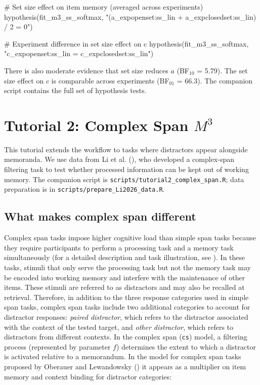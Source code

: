 \documentclass[
  man,
  floatsintext,
  longtable,
  nolmodern,
  notxfonts,
  notimes,
  colorlinks=true,linkcolor=blue,citecolor=blue,urlcolor=blue]{apa7}
\newenvironment{Shaded}{\begin{snugshade}}{\end{snugshade}}
\newcommand{\CommentTok}[1]{\textcolor[rgb]{0.37,0.37,0.37}{#1}}
\newcommand{\FunctionTok}[1]{\textcolor[rgb]{0.28,0.35,0.67}{#1}}
\newcommand{\NormalTok}[1]{\textcolor[rgb]{0.00,0.23,0.31}{#1}}
\newcommand{\StringTok}[1]{\textcolor[rgb]{0.13,0.47,0.30}{#1}}
\begin{document}
\begin{Shaded}
\begin{Highlighting}[]
\CommentTok{\# Set size effect on item memory (averaged across experiments)}
\FunctionTok{hypothesis}\NormalTok{(fit\_m3\_ss\_softmax,}
  \StringTok{"(a\_expopenset:ss\_lin + a\_expclosedset:ss\_lin) / 2 = 0"}\NormalTok{)}

\CommentTok{\# Experiment difference in set size effect on c}
\FunctionTok{hypothesis}\NormalTok{(fit\_m3\_ss\_softmax,}
  \StringTok{"c\_expopenset:ss\_lin = c\_expclosedset:ss\_lin"}\NormalTok{)}
\end{Highlighting}
\end{Shaded}

There is also moderate evidence that set size reduces \(a\) (BF\(_{10}\)
= 5.79). The set size effect on \(c\) is comparable across experiments
(BF\(_{01}\) = 66.3). The companion script contains the full set of
hypothesis tests.

\section{\texorpdfstring{Tutorial 2: Complex Span
\(M^3\)}{Tutorial 2: Complex Span M\^{}3}}\label{tutorial-2-complex-span-m3}

This tutorial extends the workflow to tasks where distractors appear
alongside memoranda. We use data from Li et al.
(), who developed a complex-span
filtering task to test whether processed information can be kept out of
working memory. The companion script is
\texttt{scripts/tutorial2\_complex\_span.R}; data preparation is in
\texttt{scripts/prepare\_Li2026\_data.R}.

\subsection{What makes complex span
different}\label{what-makes-complex-span-different}

Complex span tasks impose higher cognitive load than simple span tasks
because they require participants to perform a processing task and a
memory task simultaneously (for a detailed description and task
illustration, see ). In these tasks, stimuli that only serve the processing task but not
the memory task may be encoded into working memory and interfere with
the maintenance of other items. These stimuli are referred to as
distractors and may also be recalled at retrieval. Therefore, in
addition to the three response categories used in simple span tasks,
complex span tasks include two additional categories to account for
distractor responses: \emph{paired distractor}, which refers to the
distractor associated with the context of the tested target, and
\emph{other distractor}, which refers to distractors from different
contexts. In the complex span (\texttt{cs}) model, a filtering process
(represented by parameter \(f\)) determines the extent to which a
distractor is activated relative to a memorandum. In the model for
complex span tasks proposed by Oberauer and Lewandowsky
() it appears as a multiplier on
item memory and context binding for distractor categories:
\end{document}
